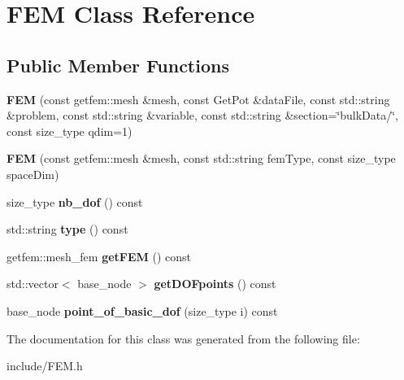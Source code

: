 \hypertarget{classFEM}{}\section{F\+EM Class Reference}
\label{classFEM}
\subsection*{Public Member Functions}
\begin{DoxyCompactItemize}
\item 
\mbox{\label{classFEM_ab722fcdf05eac04282372946c105cf15}} 
{\bfseries F\+EM} (const getfem\+::mesh \&mesh, const Get\+Pot \&data\+File, const std\+::string \&problem, const std\+::string \&variable, const std\+::string \&section=\char`\"{}bulk\+Data/\char`\"{}, const size\+\_\+type qdim=1)
\item 
\mbox{\label{classFEM_ac2a4a8bc61409257f613bea6cc536e9f}} 
{\bfseries F\+EM} (const getfem\+::mesh \&mesh, const std\+::string fem\+Type, const size\+\_\+type space\+Dim)
\item 
\mbox{\label{classFEM_aac29709ad2ddb308ae62740bfcd37e00}} 
size\+\_\+type {\bfseries nb\+\_\+dof} () const
\item 
\mbox{\label{classFEM_ad1d1ce4427213eae235f4a825c3cbfd0}} 
std\+::string {\bfseries type} () const
\item 
\mbox{\label{classFEM_afdac0edb06a989ba74098970b60bc78a}} 
getfem\+::mesh\+\_\+fem {\bfseries get\+F\+EM} () const
\item 
\mbox{\label{classFEM_aea6c7014bc1422c736bc861836be7589}} 
std\+::vector$<$ base\+\_\+node $>$ {\bfseries get\+D\+O\+Fpoints} () const
\item 
\mbox{\label{classFEM_a6852827f81343e787382cdf3f1c2d2a3}} 
base\+\_\+node {\bfseries point\+\_\+of\+\_\+basic\+\_\+dof} (size\+\_\+type i) const
\end{DoxyCompactItemize}


The documentation for this class was generated from the following file\+:\begin{DoxyCompactItemize}
\item 
include/F\+E\+M.\+h\end{DoxyCompactItemize}
